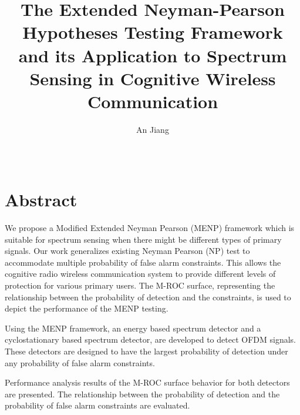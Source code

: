 \documentclass [12pt,letterpaper]{report}
\begin{document}

\title{The Extended Neyman-Pearson Hypotheses Testing Framework and its Application to Spectrum Sensing in Cognitive Wireless Communication}
\author{An Jiang}
\date{\Month\ \number\year}

\maketitle

\raggedbottom
\doublespacing
{}

\section*{\centering Abstract}
We propose a Modified Extended Neyman Pearson (MENP) framework which is suitable for spectrum sensing when there might be different types of primary signals. Our work generalizes existing Neyman Pearson (NP) test to accommodate multiple probability of false alarm constraints. This allows the cognitive radio wireless communication system to provide different levels of protection for various primary users.  
The M-ROC surface, representing the relationship between the probability of detection and the constraints, is used to depict the performance of the MENP testing.   

Using the MENP framework, an energy based spectrum detector and a cyclostationary based spectrum detector, are developed to detect OFDM signals. These detectors are designed to have the largest probability of detection under any probability of false alarm constraints.  

Performance analysis results of the M-ROC surface behavior for both detectors are presented. The relationship between the probability of detection and the probability of false alarm constraints are evaluated. 
\newpage
\end{document}

